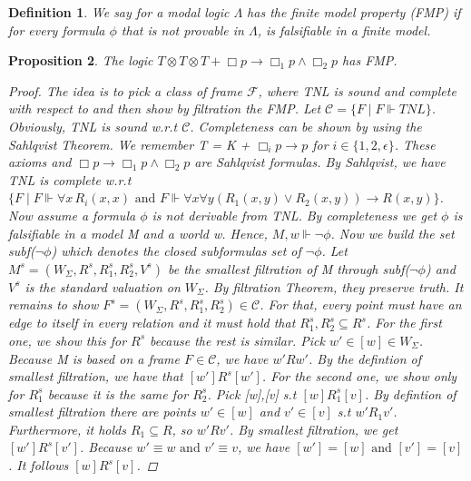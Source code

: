 \documentclass[12pt, a4paper]{scrartcl}
\newtheorem{definition}{Definition}[subsection]
\newtheorem{proposition}[definition]{Proposition}
\begin{document}
\begin{definition}
    We say for a modal logic $\Lambda$ has the finite model property (FMP) if for every formula $\phi$ that is not provable in $\Lambda$,
    is falsifiable in a finite model.
        
\end{definition}

\begin{proposition}
    The logic $T \otimes T \otimes T + \Box p \rightarrow \Box_1 p \land \Box_2 p$ has FMP.
    \begin{proof}
    The idea is to pick a class of frame $\mathcal{F}$, where TNL is sound and complete with respect to and then show by filtration the FMP. \newline \newline
    Let $\mathcal{C} = \{F \mid F \Vdash TNL\}$. Obviously,  TNL is sound w.r.t $\mathcal{C}$. Completeness can be shown by using the Sahlqvist Theorem.
    We remember T = K + $\Box_i p \rightarrow p$ for $i \in \{1,2, \epsilon\}$. These axioms and $\Box p \rightarrow \Box_1 p \land \Box_2 p$ are Sahlqvist formulas. 
    By Sahlqvist, we have TNL is complete w.r.t $\{F \mid F \Vdash \forall x \, R_i(x,x) \mbox{ and } F \Vdash \forall x \forall y (R_1(x,y) \lor R_2(x,y)) \rightarrow R(x,y)\}$. \newline \newline
    Now assume a formula $\phi$ is not derivable from TNL. By completeness we get $\phi$ is falsifiable in a model M and a world w. Hence, $M,w \Vdash \neg \phi$. Now we build the set subf($\neg \phi$) which denotes the closed subformulas set of $\neg \phi$.
    Let $M^s = (W_\Sigma, R^s, R^s_1, R^s_2, V^s)$ be the smallest filtration of M through subf($\neg \phi$) and $V^s$ is the standard valuation on $W_\Sigma$. By filtration Theorem, they preserve truth.
    It remains to show $F^s = (W_\Sigma, R^s, R^s_1, R^s_2)\in  \mathcal{C}$. For that, every point must have an edge to itself in every relation and it must hold that $R^s_1,R^s_2 \subseteq R^s$. For the first one, we show this for $R^s$ because the rest is similar.
    Pick $w' \in [w]\in W_\Sigma$. Because M is based on a frame $F \in \mathcal{C}$, we have $w'Rw'$. By the defintion of smallest filtration, we have that $[w']R^s[w']$. For the second one, we show only for $R^s_1$ because it is the same for $R^s_2$.
    Pick [w],[v] s.t $[w]R^s_1[v]$. By defintion of smallest filtration there are points $w' \in [w]$ and $v' \in [v]$ s.t $w'R_1v'$. Furthermore, it holds $R_1 \subseteq R$, so $w'Rv'$.
    By smallest filtration, we get $[w']R^s[v']$. Because $w' \equiv w \mbox{ and } v' \equiv v$, we have $[w'] = [w] \mbox{ and } [v'] = [v]$. It follows $[w]R^s[v]$.
    
    \end{proof}
        
\end{proposition}
\end{document}
